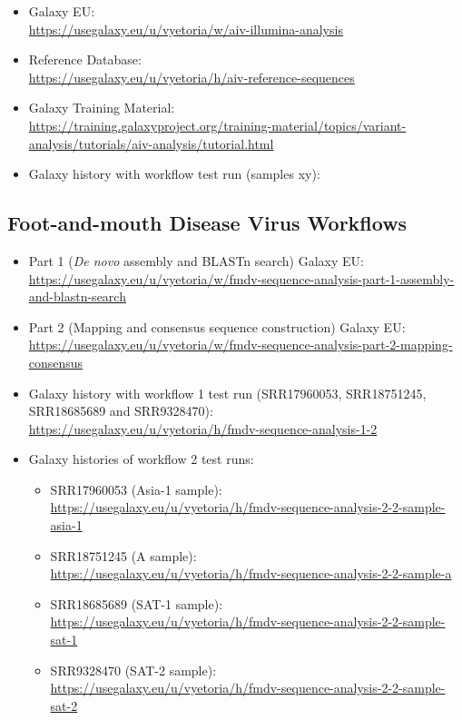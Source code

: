 \label{sec:apx-aiv-links}
\begin{itemize}
	\setlength{\itemsep}{-0.4cm}
	\item Galaxy EU:\\
	\url{https://usegalaxy.eu/u/vyetoria/w/aiv-illumina-analysis}
	\item Reference Database:\\
	\url{https://usegalaxy.eu/u/vyetoria/h/aiv-reference-sequences}
	\item Galaxy Training Material:\\
	\url{https://training.galaxyproject.org/training-material/topics/variant-analysis/tutorials/aiv-analysis/tutorial.html}
	\item Galaxy history with workflow test run (samples xy): \todoit
\end{itemize}

\subsection*{\thesubsection \quad Foot-and-mouth Disease Virus Workflows}
\label{sec:apx-fmdv-links}

\begin{itemize}
	\setlength{\itemsep}{-0.4cm}
	\item Part 1 (\textit{De novo} assembly and BLASTn search) Galaxy EU:\\
	\url{https://usegalaxy.eu/u/vyetoria/w/fmdv-sequence-analysis-part-1-assembly-and-blastn-search}
	\item Part 2 (Mapping and consensus sequence construction) Galaxy EU:\\
	\url{https://usegalaxy.eu/u/vyetoria/w/fmdv-sequence-analysis-part-2-mapping-consensus}
	\item Galaxy history with workflow 1 test run (SRR17960053, SRR18751245, SRR18685689 and SRR9328470):\\
	\url{https://usegalaxy.eu/u/vyetoria/h/fmdv-sequence-analysis-1-2}
	\item Galaxy histories of workflow 2 test runs:
	\begin{itemize}
		\item SRR17960053 (Asia-1 sample):\\
		\url{https://usegalaxy.eu/u/vyetoria/h/fmdv-sequence-analysis-2-2-sample-asia-1}
		\item SRR18751245 (A sample):\\
		\url{https://usegalaxy.eu/u/vyetoria/h/fmdv-sequence-analysis-2-2-sample-a}
		\item SRR18685689 (SAT-1 sample):\\
		\url{https://usegalaxy.eu/u/vyetoria/h/fmdv-sequence-analysis-2-2-sample-sat-1}
		\item SRR9328470 (SAT-2 sample):\\
		\url{https://usegalaxy.eu/u/vyetoria/h/fmdv-sequence-analysis-2-2-sample-sat-2}
	\end{itemize}
\end{itemize}


